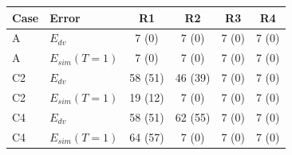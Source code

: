 \begin{tabular}{llcccc}\toprule Case & Error & R1 & R2 & R3 & R4\\\midrule
A & $E_{dv}$ & 7 (0) & 7 (0) & 7 (0) & 7 (0)\\
A & $E_{sim}(T{=}1)$ & 7 (0) & 7 (0) & 7 (0) & 7 (0)\\
C2 & $E_{dv}$ & 58 (51) & 46 (39) & 7 (0) & 7 (0)\\
C2 & $E_{sim}(T{=}1)$ & 19 (12) & 7 (0) & 7 (0) & 7 (0)\\
C4 & $E_{dv}$ & 58 (51) & 62 (55) & 7 (0) & 7 (0)\\
C4 & $E_{sim}(T{=}1)$ & 64 (57) & 7 (0) & 7 (0) & 7 (0)\\
\bottomrule\end{tabular}